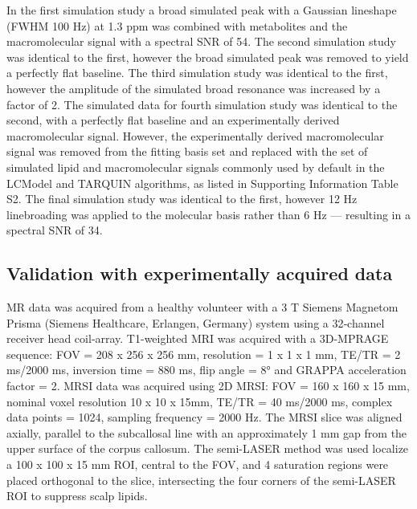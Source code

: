 \documentclass[num-refs]{wiley-article}
\begin{document}
In the first simulation study a broad simulated peak with a Gaussian lineshape (FWHM 100 Hz) at 1.3 ppm was combined with metabolites and the macromolecular signal with a spectral SNR of 54. The second simulation study was identical to the first, however the broad simulated peak was removed to yield a perfectly flat baseline. The third simulation study was identical to the first, however the amplitude of the simulated broad resonance was increased by a factor of 2. The simulated data for fourth simulation study was identical to the second, with a perfectly flat baseline and an experimentally derived macromolecular signal. However, the experimentally derived macromolecular signal was removed from the fitting basis set and replaced with the set of simulated lipid and macromolecular signals commonly used by default in the LCModel and TARQUIN algorithms, as listed in Supporting Information Table S2. The final simulation study was identical to the first, however 12 Hz linebroading was applied to the molecular basis rather than 6 Hz --- resulting in a spectral SNR of 34.

\subsection{Validation with experimentally acquired data}

MR data was acquired from a healthy volunteer with a 3 T Siemens Magnetom Prisma (Siemens Healthcare, Erlangen, Germany) system using a 32‐channel receiver head coil‐array. T1-weighted MRI was acquired with a 3D-MPRAGE sequence: FOV = 208 x 256 x 256 mm, resolution = 1 x 1 x 1 mm, TE/TR = 2 ms/2000 ms, inversion time = 880 ms, flip angle = \ang{8} and GRAPPA acceleration factor = 2. MRSI data was acquired using 2D MRSI: FOV = 160 x 160 x 15 mm, nominal voxel resolution 10 x 10 x 15mm, TE/TR = 40 ms/2000 ms, complex data points = 1024, sampling frequency = 2000 Hz. The MRSI slice was aligned axially, parallel to the subcallosal line with an approximately 1 mm gap from the upper surface of the corpus callosum. The semi-LASER method \cite{Scheenen2008} was used localize a 100 x 100 x 15 mm ROI, central to the FOV, and 4 saturation regions were placed orthogonal to the slice, intersecting the four corners of the semi-LASER ROI to suppress scalp lipids.
\end{document}

